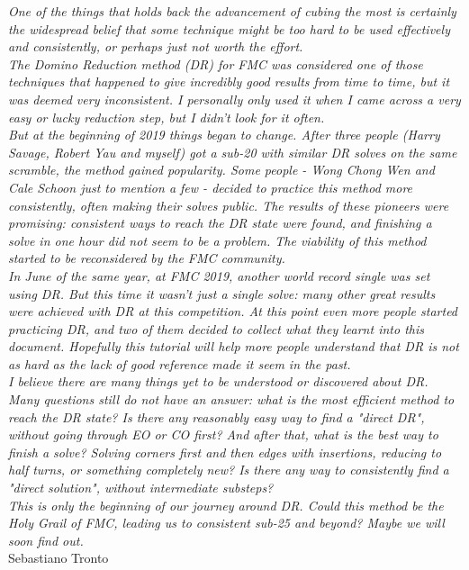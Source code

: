 \documentclass[11pt,a4paper]{book}
\begin{document}
\textit{One of the things that holds back the advancement of cubing the most is certainly the widespread belief that some technique might be too hard to be used effectively and consistently, or perhaps just not worth the effort.\\
The Domino Reduction method (DR) for FMC was considered one of those techniques that happened to give incredibly good results from time to time, but it was deemed very inconsistent. I personally only used it when I came across a very easy or lucky reduction step, but I didn't look for it often.\\
But at the beginning of 2019 things began to change. After three people (Harry Savage, Robert Yau and myself) got a sub-20 with similar DR solves on the same scramble, the method gained popularity. Some people - Wong Chong Wen and Cale Schoon just to mention a few - decided to practice this method more consistently, often making their solves public. The results of these pioneers were promising: consistent ways to reach the DR state were found, and finishing a solve in one hour did not seem to be a problem. The viability of this method started to be reconsidered by the FMC community.\\
In June of the same year, at FMC 2019, another world record single was set using DR. But this time it wasn't just a single solve: many other great results were achieved with DR at this competition. At this point even more people started practicing DR, and two of them decided to collect what they learnt into this document. Hopefully this tutorial will help more people understand that DR is not as hard as the lack of good reference made it seem in the past.\\
I believe there are many things yet to be understood or discovered about DR. Many questions still do not have an answer: what is the most efficient method to reach the DR state? Is there any reasonably easy way to find a "direct DR", without going through EO or CO first? And after that, what is the best way to finish a solve? Solving corners first and then edges with insertions, reducing to half turns, or something completely new? Is there any way to consistently find a "direct solution", without intermediate substeps?\\
This is only the beginning of our journey around DR. Could this method be the Holy Grail of FMC, leading us to consistent sub-25 and beyond? Maybe we will soon find out.}\\
\bigskip
\hfill Sebastiano Tronto
\end{document}
